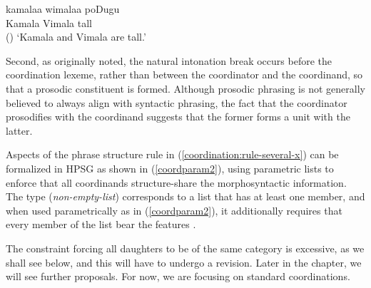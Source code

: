 \ea
\label{telugu}
\gll kamalaa wimalaa poDugu \\ 
     Kamala Vimala tall\\\hfill()
\glt `Kamala and Vimala are tall.'
\z

\largerpage
Second, as \citet[165]{ross67} originally noted, the natural intonation break occurs before the
coordination lexeme, rather than between the coordinator and the coordinand, so that a  prosodic
constituent is formed. Although prosodic phrasing is not generally believed to always align with
syntactic phrasing, the fact that the coordinator prosodifies with the  coordinand suggests that the
former forms a unit with the latter. 

Aspects of the phrase structure rule in (\ref{coordination:rule-several-x}) can be formalized in
HPSG as shown in (\ref{coordparam2}), using parametric lists \citep[, fn.\,2]{pollardsag}
to enforce that all coordinands structure-share the morphosyntactic information. The type
 (\textit{non-empty-list}) corresponds to a list that has at least one member, and
when used parametrically as in (\ref{coordparam2}), it additionally requires that every member of
the list bear the features .

\ea 
{}
\label{coordparam2}
\z

\noindent
The constraint forcing all daughters to be of the same category is excessive, as we shall see below,
and this will have to undergo a revision. Later in the chapter, we will see further proposals. For
now, we are focusing on standard coordinations. 

